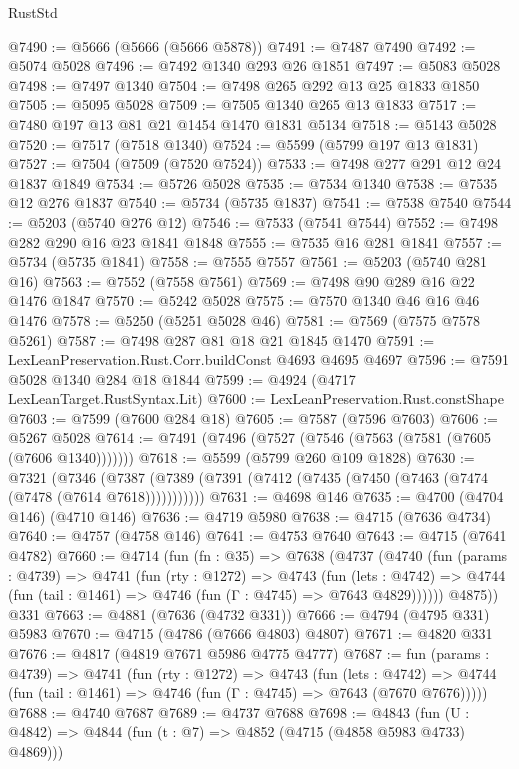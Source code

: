 \begin{lexlean}{RustStd}
\begin{coremodule}
@7490 := @5666 (@5666 (@5666 @5878))
@7491 := @7487 @7490
@7492 := @5074 @5028
@7496 := @7492 @1340 @293 @26 @1851
@7497 := @5083 @5028
@7498 := @7497 @1340
@7504 := @7498 @265 @292 @13 @25 @1833 @1850
@7505 := @5095 @5028
@7509 := @7505 @1340 @265 @13 @1833
@7517 := @7480 @197 @13 @81 @21 @1454 @1470 @1831 @5134
@7518 := @5143 @5028
@7520 := @7517 (@7518 @1340)
@7524 := @5599 (@5799 @197 @13 @1831)
@7527 := @7504 (@7509 (@7520 @7524))
@7533 := @7498 @277 @291 @12 @24 @1837 @1849
@7534 := @5726 @5028
@7535 := @7534 @1340
@7538 := @7535 @12 @276 @1837
@7540 := @5734 (@5735 @1837)
@7541 := @7538 @7540
@7544 := @5203 (@5740 @276 @12)
@7546 := @7533 (@7541 @7544)
@7552 := @7498 @282 @290 @16 @23 @1841 @1848
@7555 := @7535 @16 @281 @1841
@7557 := @5734 (@5735 @1841)
@7558 := @7555 @7557
@7561 := @5203 (@5740 @281 @16)
@7563 := @7552 (@7558 @7561)
@7569 := @7498 @90 @289 @16 @22 @1476 @1847
@7570 := @5242 @5028
@7575 := @7570 @1340 @46 @16 @46 @1476
@7578 := @5250 (@5251 @5028 @46)
@7581 := @7569 (@7575 @7578 @5261)
@7587 := @7498 @287 @81 @18 @21 @1845 @1470
@7591 := LexLeanPreservation.Rust.Corr.buildConst @4693 @4695 @4697
@7596 := @7591 @5028 @1340 @284 @18 @1844
@7599 := @4924 (@4717 LexLeanTarget.RustSyntax.Lit)
@7600 := LexLeanPreservation.Rust.constShape
@7603 := @7599 (@7600 @284 @18)
@7605 := @7587 (@7596 @7603)
@7606 := @5267 @5028
@7614 := @7491 (@7496 (@7527 (@7546 (@7563 (@7581 (@7605 (@7606 @1340)))))))
@7618 := @5599 (@5799 @260 @109 @1828)
@7630 := @7321
    (@7346 (@7387 (@7389 (@7391 (@7412 (@7435 (@7450 (@7463 (@7474 (@7478 (@7614 @7618)))))))))))
@7631 := @4698 @146
@7635 := @4700 (@4704 @146) (@4710 @146)
@7636 := @4719 @5980
@7638 := @4715 (@7636 @4734)
@7640 := @4757 (@4758 @146)
@7641 := @4753 @7640
@7643 := @4715 (@7641 @4782)
@7660 := @4714
    (fun (fn : @35) =>
    @7638
      (@4737
        (@4740
          (fun (params : @4739) =>
          @4741
            (fun (rty : @1272) =>
            @4743
              (fun (lets : @4742) =>
              @4744 (fun (tail : @1461) => @4746 (fun (Γ : @4745) => @7643 @4829))))))
        @4875))
    @331
@7663 := @4881 (@7636 (@4732 @331))
@7666 := @4794 (@4795 @331) @5983
@7670 := @4715 (@4786 (@7666 @4803) @4807)
@7671 := @4820 @331
@7676 := @4817 (@4819 @7671 @5986 @4775 @4777)
@7687 := fun (params : @4739) =>
  @4741
    (fun (rty : @1272) =>
    @4743
      (fun (lets : @4742) =>
      @4744 (fun (tail : @1461) => @4746 (fun (Γ : @4745) => @7643 (@7670 @7676)))))
@7688 := @4740 @7687
@7689 := @4737 @7688
@7698 := @4843 (fun (U : @4842) => @4844 (fun (t : @7) => @4852 (@4715 (@4858 @5983 @4733) @4869)))

\end{coremodule}
\end{lexlean}
